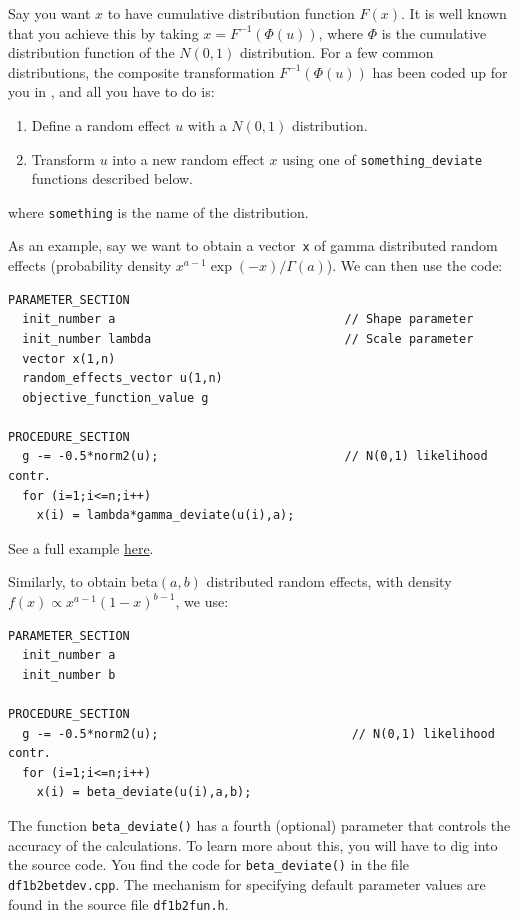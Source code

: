 \documentclass{admbmanual}
\begin{document}
Say you want $x$ to have cumulative distribution function $F(x)$. It is well
known that you achieve this by taking $x=F^{-1}(\Phi(u))$, where $\Phi$ is the
cumulative distribution function of the $N(0,1)$ distribution. For a few common
distributions, the composite transformation $F^{-1}(\Phi(u))$ has been coded up
for you in \scAR, and all you have to do is:
\begin{enumerate}
  \item Define a random effect $u$ with a $N(0,1)$ distribution.
  \item Transform $u$ into a new random effect $x$ using one of
  \texttt{something\_deviate} functions described below.
\end{enumerate}
where \texttt{something} is the name of the distribution.

As an example, say we want to obtain a vector~\texttt{x} of gamma distributed
random effects (probability density $x^{a-1}\exp(-x)/\Gamma(a)$). We can then
use the code:
\begin{lstlisting}
PARAMETER_SECTION
  init_number a                                // Shape parameter
  init_number lambda                           // Scale parameter
  vector x(1,n)
  random_effects_vector u(1,n)
  objective_function_value g

PROCEDURE_SECTION
  g -= -0.5*norm2(u);          	               // N(0,1) likelihood contr.
  for (i=1;i<=n;i++)
    x(i) = lambda*gamma_deviate(u(i),a);
\end{lstlisting}

See a full example
\href{http://www.admb-project.org/otter-research/admbre/examples/gamma/gamma.html}{here}.

Similarly, to obtain beta$(a,b)$ distributed random effects, with density
$f(x)\propto x^{a-1}(1-x)^{b-1}$, we use:
\begin{lstlisting}
PARAMETER_SECTION
  init_number a
  init_number b

PROCEDURE_SECTION
  g -= -0.5*norm2(u);                           // N(0,1) likelihood contr.
  for (i=1;i<=n;i++)
    x(i) = beta_deviate(u(i),a,b);
\end{lstlisting}
The function \texttt{beta\_deviate()} has a fourth (optional) parameter that
controls the accuracy of the calculations. To learn more about this, you will
have to dig into the source code. You find the code for \texttt{beta\_deviate()}
in the file \texttt{df1b2betdev.cpp}. The mechanism for specifying default
parameter values are found in the source file \texttt{df1b2fun.h}.
\end{document}
